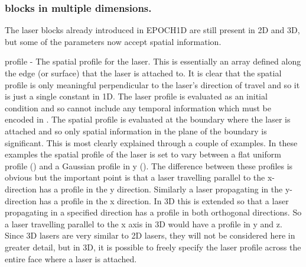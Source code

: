 \subsubsection{ blocks in multiple dimensions.}
\label{sec:multilaser}

The laser blocks already introduced in EPOCH1D are still present in
2D and 3D, but some of the parameters now accept spatial information.\\


{\emphtext profile} - The spatial profile for the laser. This is
essentially an array defined along the edge (or surface) that the laser is
attached to. It is clear that the spatial profile is only meaningful
perpendicular to the laser's direction of travel and so it is just a single
constant in 1D. The laser profile is evaluated as an initial condition
and so cannot include any temporal information which must be
encoded in .  The spatial profile is evaluated at the
boundary where the laser is attached and so only spatial information in the
plane of the boundary is significant. This is most clearly explained through a
couple of examples. In these examples the spatial profile of the laser is set
to vary between a flat uniform profile () and a
Gaussian profile in y (). The
difference between these profiles is obvious but the important point is that a
laser travelling parallel to the x-direction has a profile in the y
direction. Similarly a laser propagating in the y-direction has a profile in
the x direction. In 3D this is extended so that a laser propagating in a
specified direction has a profile in both orthogonal directions. So a laser
travelling parallel to the x axis in 3D would have a profile in y and z. Since
3D lasers are very similar to 2D lasers, they will not be considered here in
greater detail, but in 3D, it is possible to freely specify the laser profile
across the entire face where a laser is attached.\\



